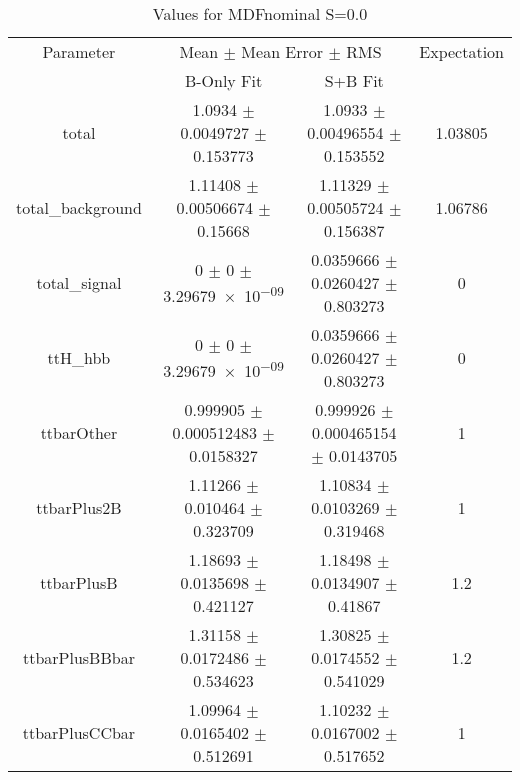 \begin{table}
\centering
\caption{Values for MDFnominal S=0.0}
\begin{tabular}{cccc}
\toprule
Parameter & \multicolumn{2}{c}{Mean $\pm$ Mean Error $\pm$ RMS} & Expectation\\
 & B-Only Fit & S+B Fit & \\
\midrule
total & \num{1.0934} $\pm$ \num{0.0049727} $\pm$ \num{0.153773} & \num{1.0933} $\pm$ \num{0.00496554} $\pm$ \num{0.153552} & \num{1.03805}\\
total\_background & \num{1.11408} $\pm$ \num{0.00506674} $\pm$ \num{0.15668} & \num{1.11329} $\pm$ \num{0.00505724} $\pm$ \num{0.156387} & \num{1.06786}\\
total\_signal & \num{0} $\pm$ \num{0} $\pm$ \num{3.29679e-09} & \num{0.0359666} $\pm$ \num{0.0260427} $\pm$ \num{0.803273} & \num{0}\\
ttH\_hbb & \num{0} $\pm$ \num{0} $\pm$ \num{3.29679e-09} & \num{0.0359666} $\pm$ \num{0.0260427} $\pm$ \num{0.803273} & \num{0}\\
ttbarOther & \num{0.999905} $\pm$ \num{0.000512483} $\pm$ \num{0.0158327} & \num{0.999926} $\pm$ \num{0.000465154} $\pm$ \num{0.0143705} & \num{1}\\
ttbarPlus2B & \num{1.11266} $\pm$ \num{0.010464} $\pm$ \num{0.323709} & \num{1.10834} $\pm$ \num{0.0103269} $\pm$ \num{0.319468} & \num{1}\\
ttbarPlusB & \num{1.18693} $\pm$ \num{0.0135698} $\pm$ \num{0.421127} & \num{1.18498} $\pm$ \num{0.0134907} $\pm$ \num{0.41867} & \num{1.2}\\
ttbarPlusBBbar & \num{1.31158} $\pm$ \num{0.0172486} $\pm$ \num{0.534623} & \num{1.30825} $\pm$ \num{0.0174552} $\pm$ \num{0.541029} & \num{1.2}\\
ttbarPlusCCbar & \num{1.09964} $\pm$ \num{0.0165402} $\pm$ \num{0.512691} & \num{1.10232} $\pm$ \num{0.0167002} $\pm$ \num{0.517652} & \num{1}\\
\bottomrule
\end{tabular}
\end{table}